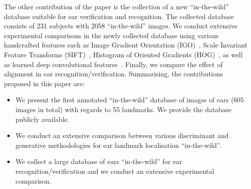 



The other contribution of the paper is the collection of a new ``in-the-wild'' database suitable for ear
verification and recognition. The collected database consists of 231 subjects with 2058 ``in-the-wild'' images. We conduct extensive experimental comparisons in the newly collected database using various handcrafted features such as Image Gradient Orientation (IGO)~\cite{tzimiropoulos2012subspace}, Scale Invariant Feature Transforms (SIFT)~\cite{lowe1999object}, Histogram of Oriented Gradients (HOG)~\cite{Dalal2005}, as well as learned deep convolutional features~\cite{sermanet2013overfeat}. Finally, we compare the effect of alignment in ear recognition/verification.
Summarising, the contributions proposed in this paper are:
    \begin{itemize}
    \item We present the first annotated ``in-the-wild'' database of images of ears (605 images in total) with regards to 55 landmarks. We provide the database publicly available.
    \item We conduct an extensive comparison between various discriminant and generative methodologies for ear landmark localisation ``in-the-wild''.
    \item We collect a large database of ears ``in-the-wild'' for ear recognition/verification and we conduct an extensive experimental comparison. 
    \end{itemize}

